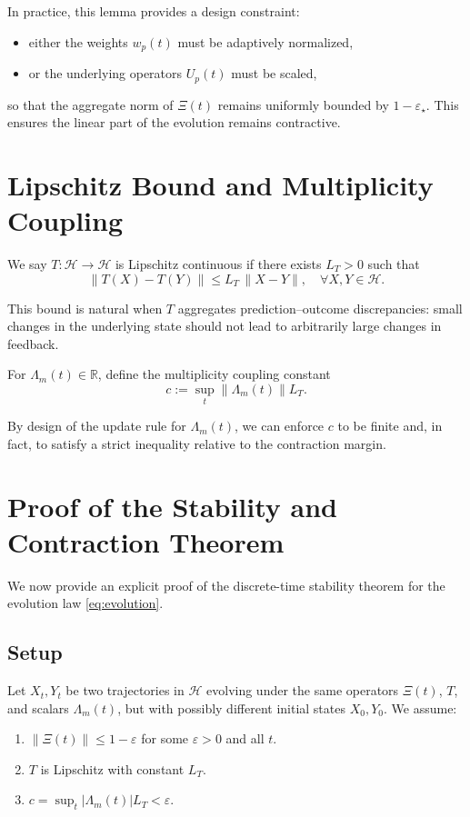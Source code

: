 \documentclass[11pt]{article}
\begin{document}
In practice, this lemma provides a design constraint:
\begin{itemize}
  \item either the weights \(w_p(t)\) must be adaptively normalized,
  \item or the underlying operators \(U_p(t)\) must be scaled,
\end{itemize}
so that the aggregate norm of \(\Xi(t)\) remains uniformly bounded by \(1 - \varepsilon_\star\). This ensures the linear part of the evolution remains contractive.

\section{Lipschitz Bound and Multiplicity Coupling}

\begin{definition}
We say \(T : \mathcal{H} \to \mathcal{H}\) is Lipschitz continuous if there exists \(L_T > 0\) such that
\[
  \|T(X) - T(Y)\| \leq L_T \, \|X - Y\|, \quad \forall X, Y \in \mathcal{H}.
\]
\end{definition}

This bound is natural when \(T\) aggregates prediction--outcome discrepancies: small changes in the underlying state should not lead to arbitrarily large changes in feedback.

\begin{definition}
For \(\Lambda_m(t) \in \mathbb{R}\), define the multiplicity coupling constant
\[
  c := \sup_{t} \|\Lambda_m(t)\| L_T.
\]
\end{definition}

By design of the update rule for \(\Lambda_m(t)\), we can enforce \(c\) to be finite and, in fact, to satisfy a strict inequality relative to the contraction margin.

\section{Proof of the Stability and Contraction Theorem}

We now provide an explicit proof of the discrete-time stability theorem for the evolution law \eqref{eq:evolution}.

\subsection{Setup}

Let \(X_t, Y_t\) be two trajectories in \(\mathcal{H}\) evolving under the same operators \(\Xi(t)\), \(T\), and scalars \(\Lambda_m(t)\), but with possibly different initial states \(X_0, Y_0\). We assume:
\begin{enumerate}
  \item \(\|\Xi(t)\| \leq 1 - \varepsilon\) for some \(\varepsilon > 0\) and all \(t\).
  \item \(T\) is Lipschitz with constant \(L_T\).
  \item \(c = \sup_t |\Lambda_m(t)| L_T < \varepsilon\).
\end{enumerate}
\end{document}
